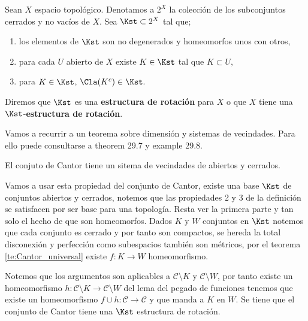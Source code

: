 \begin{df}
Sean $X$ espacio topológico. Denotamos a $2^X$ la colección de los subconjuntos cerrados y no vacíos de $X$.  Sea $\Kst \subset 2^X$ tal que;
 	
	\begin{enumerate}
	\item los elementos de $\Kst$ son no degenerados y homeomorfos unos con otros,
	\item para cada $U$ abierto de $X$ existe $K \in \Kst$ tal que $K \subset U,$
	\item para $K \in \Kst$, $\Cla(K^c) \in \Kst.$
	\end{enumerate}

Diremos que $\Kst$ es una \textbf{estructura de rotación} para $X$ o que $X$ tiene una $\Kst$-\textbf{estructura de rotación}.
\end{df}

Vamos a recurrir a un teorema sobre dimensión y sistemas de vecindades. Para ello puede consultarse a \cite{top_willd} theorem  29.7 y example 29.8.

\begin{te}
El conjuto de Cantor tiene un sitema de vecindades de abiertos y cerrados. 
\end{te}

Vamos a usar esta propiedad del conjunto de Cantor, existe una base $\Kst$ de conjuntos abiertos y cerrados, notemos que las propiedades 2 y 3 de la definición se satisfacen por ser base para una topología. Resta ver la primera parte y tan solo el hecho de que son homeomorfos. Dados $K$ y $W$ conjuntos en $\Kst$ notemos que cada conjunto es cerrado y por tanto son compactos, se hereda la total disconexión y perfección como subespacios también son métricos, por el teorema \ref{te:Cantor_universal} existe $f:K \to W$ homeomorfismo.

Notemos que los argumentos son aplicables a $\mathcal{C} \setminus K$ y  $\mathcal{C} \setminus W$, por tanto existe un homeomorfismo $h:\mathcal{C} \setminus K \to \mathcal{C} \setminus W$ del lema del pegado de funciones tenemos que existe un homeomorfismo $f \cup h: \mathcal{C} \to \mathcal{C}$ y que  manda a $K$ en $W.$  Se tiene que el conjunto de Cantor tiene una $\Kst$ estructura de rotación. 


